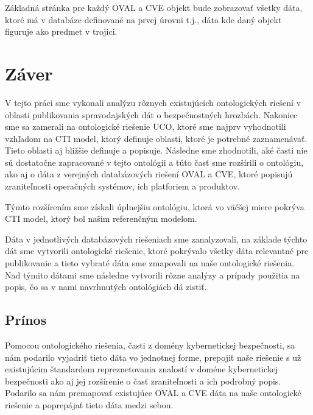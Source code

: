 \documentclass[12pt, a4paper, oneside]{book}
\begin{document}
Základná stránka pre každý OVAL a CVE objekt bude zobrazovať všetky dáta, ktoré má v databáze definované na prvej úrovni t.j., dáta kde daný objekt figuruje ako predmet v trojici. 



\chapter{Záver}

V tejto práci sme vykonali analýzu rôznych existujúcich ontologických riešení v
oblasti publikovania spravodajských dát o bezpečnostných hrozbách. Nakoniec sme
sa zamerali na ontologické riešenie UCO, ktoré sme najprv vyhodnotili vzhľadom
na CTI model, ktorý definuje oblasti, ktoré je potrebné zaznamenávať. Tieto oblasti aj bližšie definuje a popisuje. Následne sme zhodnotili, aké časti nie sú dostatočne zapracované
v tejto ontológii a túto časť sme rozšírili o ontológiu, ako aj o dáta z
verejných databázových riešení OVAL a CVE, ktoré popisujú zraniteľnosti
operačných systémov, ich platforiem a produktov.


Týmto rozšírením sme získali úplnejšiu ontológiu, ktorá vo väčšej miere pokrýva CTI model, ktorý bol naším referenčným modelom.


Dáta v jednotlivých databázových riešeniach sme zanalyzovali, na základe týchto dát sme vytvorili ontologické riešenie, ktoré pokrývalo všetky dáta relevantné pre publikovanie a tieto vybraté dáta sme zmapovali na naše ontologické riešenia. Nad týmito dátami sme následne vytvorili rôzne analýzy a prípady použitia na popis, čo sa v nami navrhnutých ontológiách dá zistiť.


\section*{Prínos}
Pomocou ontologického riešenia, časti z domény kybernetickej bezpečnosti, sa nám podarilo vyjadriť tieto dáta vo jednotnej forme, prepojiť naše riešenie s už existujúcim štandardom repreznetovania znalostí v doméne kybernetickej bezpečnosti ako aj jej rozšírenie o časť zraniteľnosti a ich podrobný popis. Podarilo sa nám premapovať existujúce OVAL a CVE dáta na naše ontologické riešenie a poprepájať tieto dáta medzi sebou.
\end{document}
